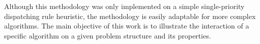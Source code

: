 \documentclass[10pt]{llncs} %
\begin{document}
Although this methodology was only implemented on a simple single-priority dispatching rule heuristic, the methodology is easily adaptable for more complex algorithms. The main objective of this work is to illustrate the interaction of a specific algorithm on a given problem structure and its properties.






\end{document}
